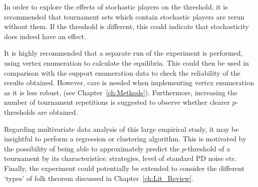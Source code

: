 In order to explore the effects of stochastic players on the threshold, it is
recommended that tournament sets which contain stochastic
players are rerun without them. If the threshold is different, this could indicate that stochasticity does indeed have an effect.

It is highly recommended that a separate run of the experiment is performed,
using vertex enumeration to calculate the equilibria. This could then be used in comparison
with the support enumeration data to check the reliability of the results obtained. However, care is needed when implementing vertex
enumeration as it is less robust, (see Chapter~\ref{ch:Methods}).
Furthermore, increasing the number of tournament repetitions is suggested to
observe whether clearer \(p\)-thresholds are obtained.

Regarding multivariate data analysis of this large empirical study, it may be
insightful to perform a regression or clustering algorithm. This is motivated by
the possibility of being able to approximately predict the \(p\)-threshold of a
tournament by its characteristics: strategies, level of standard PD noise etc.
Finally, the experiment could potentially be extended to consider the different
`types' of folk theorem discussed in Chapter~\ref{ch:Lit_Review}. 
